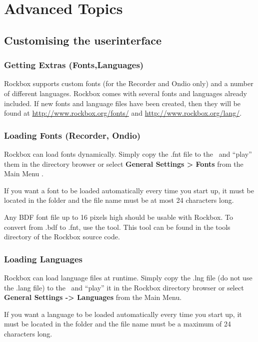 \chapter{Advanced Topics}

\section{\label{ref:CustomisingUI}Customising the userinterface}
\subsection{\label{ref:GettingExtras}Getting Extras (Fonts,Languages)}
Rockbox supports custom fonts (for the Recorder and Ondio only) and a number of different languages. Rockbox comes with several fonts and languages already included. If new fonts and language files have been created, then they will be found at \url{http://www.rockbox.org/fonts/} and \url{http://www.rockbox.org/lang/}.

\subsection{\label{ref:Loadingfonts}Loading Fonts (Recorder, Ondio)}
Rockbox can load fonts dynamically. Simply copy the .fnt file to the \dap\ and ``play'' them in the directory browser or select \textbf{General Settings {\textgreater} Fonts} from the Main Menu .

If you want a font to be loaded automatically every time you start up,
it must be located in the folder and the file name
must be at most 24 characters long.

Any BDF font file up to 16 pixels high should be usable with Rockbox. To
convert from .bdf to .fnt, use the  tool. This tool can be found in the tools directory of the Rockbox source code.

\subsection{\label{ref:Loadinglanguages}Loading Languages}
Rockbox can load language files at runtime. Simply copy the .lng file (do not use the .lang file) to the \dap\ and ``play'' it in the Rockbox directory browser or select \textbf{General Settings {}-{\textgreater} Languages }from the Main Menu.

If you want a language to be loaded automatically every time you start up, it must be located in the folder and the file name must be a maximum of 24 characters long.

